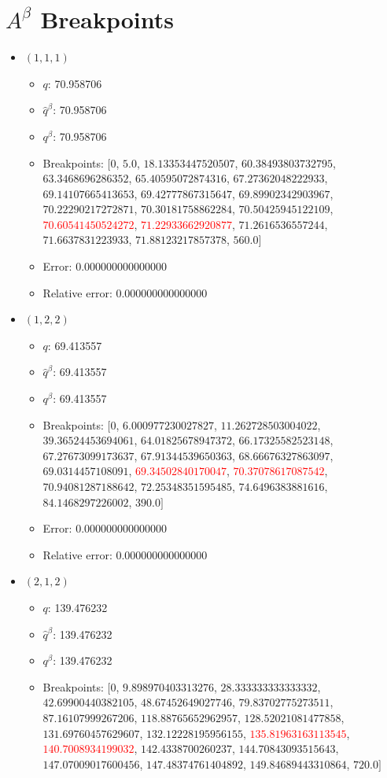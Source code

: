 \documentclass{article}%
\begin{document}
\section{$A^\beta$ Breakpoints}%
\thispagestyle{plain}%
\begin{itemize}%
	\item $(1, 1, 1)$%
	\begin{itemize}%
		\item $q$: 70.958706%
		\item $\hat{q}^\beta$: 70.958706%
		\item $q^\beta$: 70.958706%
		\item Breakpoints: $[$$0$, $5.0$, $18.13353447520507$, $60.38493803732795$, $63.3468696286352$, $65.40595072874316$, $67.27362048222933$, $69.14107665413653$, $69.42777867315647$, $69.89902342903967$, $70.22290217272871$, $70.30181758862284$, $70.50425945122109$, \textcolor{red}{$70.60541450524272$}, \textcolor{red}{$71.22933662920877$}, $71.2616536557244$, $71.6637831223933$, $71.88123217857378$, $560.0$$]$%
		\item Error: 0.000000000000000%
		\item Relative error: 0.000000000000000%
	\end{itemize}%
	\item $(1, 2, 2)$%
	\begin{itemize}%
		\item $q$: 69.413557%
		\item $\hat{q}^\beta$: 69.413557%
		\item $q^\beta$: 69.413557%
		\item Breakpoints: $[$$0$, $6.000977230027827$, $11.262728503004022$, $39.36524453694061$, $64.01825678947372$, $66.17325582523148$, $67.27673099173637$, $67.91344539650363$, $68.66676327863097$, $69.0314457108091$, \textcolor{red}{$69.34502840170047$}, \textcolor{red}{$70.37078617087542$}, $70.94081287188642$, $72.25348351595485$, $74.6496383881616$, $84.1468297226002$, $390.0$$]$%
		\item Error: 0.000000000000000%
		\item Relative error: 0.000000000000000%
	\end{itemize}%
	\item $(2, 1, 2)$%
	\begin{itemize}%
		\item $q$: 139.476232%
		\item $\hat{q}^\beta$: 139.476232%
		\item $q^\beta$: 139.476232%
		\item Breakpoints: $[$$0$, $9.898970403313276$, $28.333333333333332$, $42.69900440382105$, $48.67452649027746$, $79.83702775273511$, $87.16107999267206$, $118.88765652962957$, $128.52021081477858$, $131.69760457629607$, $132.12228195956155$, \textcolor{red}{$135.81963163113545$}, \textcolor{red}{$140.7008934199032$}, $142.4338700260237$, $144.70843093515643$, $147.07009017600456$, $147.48374761404892$, $149.84689443310864$, $720.0$$]$%

\end{itemize}
\end{itemize}
\end{document}
